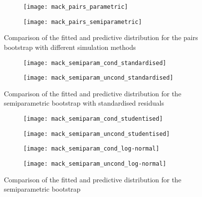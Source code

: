 \documentclass[a4paper]{book}
\begin{document}
\begin{figure}[!htb]
  \begin{subfigure}{0.45 \textwidth}
    \texttt{[image: mack\_pairs\_parametric]}
  \end{subfigure}
  \begin{subfigure}{0.45 \textwidth}
    \texttt{[image: mack\_pairs\_semiparametric]}
  \end{subfigure}
  \caption{Comparison of the fitted and predictive distribution for the pairs bootstrap with different simulation methods}
  \label{fig:fit-pred-pairs}
\end{figure}

\begin{figure}[!htb]
  \begin{subfigure}{0.45 \textwidth}
    \texttt{[image: mack\_semiparam\_cond\_standardised]}
  \end{subfigure}
  \begin{subfigure}{0.45 \textwidth}
    \texttt{[image: mack\_semiparam\_uncond\_standardised]}
  \end{subfigure}
  \caption{Comparison of the fitted and predictive distribution for the semiparametric bootstrap with standardised residuals}
  \label{fig:fit-pred-semiparam-standard}
\end{figure}

\restoregeometry

\begin{landscape}
  \begin{figure}
    \centering
    \begin{subfigure}{0.45\linewidth}
      \texttt{[image: mack\_semiparam\_cond\_studentised]}
    \end{subfigure}
    \begin{subfigure}{0.45\linewidth}
      \texttt{[image: mack\_semiparam\_uncond\_studentised]}
    \end{subfigure}
    \begin{subfigure}{0.45\linewidth}
      \texttt{[image: mack\_semiparam\_cond\_log-normal]}
    \end{subfigure}
    \begin{subfigure}{0.45\linewidth}
      \texttt{[image: mack\_semiparam\_uncond\_log-normal]}
    \end{subfigure}
    \caption{Comparison of the fitted and predictive distribution for the semiparametric bootstrap}
    \label{fig:fit-pred-semiparam-student-log-normal}
  \end{figure}
\end{landscape}
\end{document}

